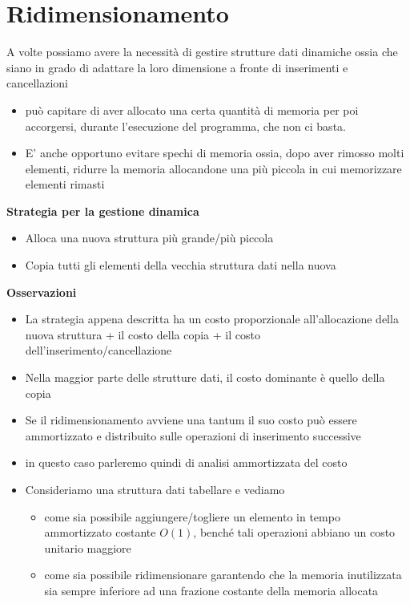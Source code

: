 \chapter{Ridimensionamento}
A volte possiamo avere la necessità di gestire strutture dati dinamiche ossia che siano in grado di adattare la loro dimensione a fronte di inserimenti e cancellazioni\\
\begin{itemize}
    \item può capitare di aver allocato una certa quantità di memoria per poi accorgersi, durante l'esecuzione del programma, che non ci basta.
    \item E' anche opportuno evitare spechi di memoria ossia, dopo aver rimosso molti elementi, ridurre la memoria allocandone una più piccola in cui memorizzare elementi rimasti
\end{itemize}
\noindent \textbf{Strategia per la gestione dinamica}\\
\begin{itemize}
    \item Alloca una nuova struttura più grande/più piccola
    \item Copia tutti gli elementi della vecchia struttura dati nella nuova
\end{itemize}
\noindent \textbf{Osservazioni}\\
\begin{itemize}
    \item La strategia appena descritta ha un costo proporzionale all'allocazione della nuova struttura + il costo della copia + il costo dell'inserimento/cancellazione
    \item Nella maggior parte delle strutture dati, il costo dominante è quello della copia
    \item Se il ridimensionamento avviene una tantum il suo costo può essere ammortizzato e distribuito sulle operazioni di inserimento successive
    \item in questo caso parleremo quindi di analisi ammortizzata del costo
    \item Consideriamo una struttura dati tabellare e vediamo
    \begin{itemize}[label=--]
        \item come sia possibile aggiungere/togliere un elemento in tempo ammortizzato costante $O(1)$, benché tali operazioni abbiano un costo unitario maggiore
        \item come sia possibile ridimensionare garantendo che la memoria inutilizzata sia sempre inferiore ad una frazione costante della memoria allocata
    \end{itemize}
\end{itemize}
